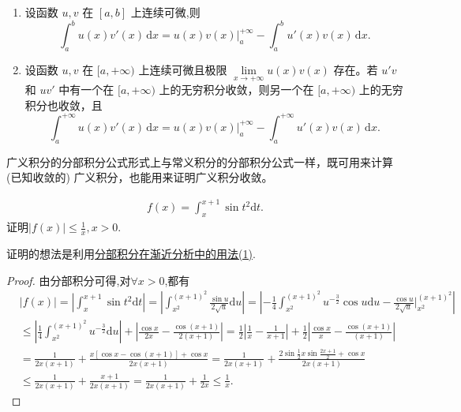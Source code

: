 \documentclass[../../main.tex]{subfiles}
\begin{document}
\begin{theorem}[分部积分公式]\label{theorem:分部积分公式}
\begin{enumerate}
\item 设函数 \( u, v \) 在 \([a, b]\) 上连续可微,则
\[
\int_a^b{u\left( x \right) v' \left( x \right) \,\mathrm{d}x}=u\left( x \right) v\left( x \right) \Big|_{a}^{+\infty}-\int_a^b{u'\left( x \right) v\left( x \right) \,\mathrm{d}x}.
\]

\item 设函数 \( u, v \) 在 \([a, +\infty)\) 上连续可微且极限 \( \lim\limits_{x \to +\infty} u(x)v(x) \) 存在。若 \( u'v \) 和 \( uv' \) 中有一个在 \([a, +\infty)\) 上的无穷积分收敛，则另一个在 \([a, +\infty)\) 上的无穷积分也收敛，且
\[
\int_a^{+\infty} u(x)v'(x) \, \mathrm{d}x = u(x)v(x) \Big |_a^{+\infty} - \int_a^{+\infty} u'(x)v(x) \, \mathrm{d}x.
\]
\end{enumerate}
\end{theorem}
\begin{remark}
广义积分的分部积分公式形式上与常义积分的分部积分公式一样，既可用来计算 (已知收敛的) 广义积分，也能用来证明广义积分收敛。
\end{remark}

\begin{example}
\begin{align*}
f\left( x \right) =\int_x^{x+1}{\sin t^2 \mathrm{d}t}.
\end{align*}
证明$\left| f\left( x \right) \right|\leqslant \frac{1}{x},x>0$.
\end{example}
\begin{note}
证明的想法是利用\hyperref[分部积分在渐近分析中的用法(1)]{分部积分在渐近分析中的用法(1)}.
\end{note}
\begin{proof}
由分部积分可得,对$\forall x>0$,都有
\begin{align*}
&\left| f\left( x \right) \right|=\left| \int_x^{x+1}{\sin t^2  \mathrm{d}t} \right|=\left| \int_{x^2}^{\left( x+1 \right) ^2}{\frac{\sin u}{2\sqrt{u}}\mathrm{d}u} \right|=\left| -\frac{1}{4}\int_{x^2}^{\left( x+1 \right) ^2}{u^{-\frac{3}{2}}\cos u\mathrm{d}u}-\frac{\cos u}{2\sqrt{u}}\Big|_{x^2}^{\left( x+1 \right) ^2} \right|
\\
&\leqslant \left| \frac{1}{4}\int_{x^2}^{\left( x+1 \right) ^2}{u^{-\frac{3}{2}}\mathrm{d}u} \right|+\left| \frac{\cos x}{2x}-\frac{\cos \left( x+1 \right)}{2\left( x+1 \right)} \right|=\frac{1}{2}\left| \frac{1}{x}-\frac{1}{x+1} \right|+\frac{1}{2}\left| \frac{\cos x}{x}-\frac{\cos \left( x+1 \right)}{\left( x+1 \right)} \right|
\\
&=\frac{1}{2x\left( x+1 \right)}+\frac{x\left[ \cos x-\cos \left( x+1 \right) \right] +\cos x}{2x\left( x+1 \right)}=\frac{1}{2x\left( x+1 \right)}+\frac{2\sin \frac{1}{2}x\sin \frac{2x+1}{2}+\cos x}{2x\left( x+1 \right)}
\\
&\leqslant \frac{1}{2x\left( x+1 \right)}+\frac{x+1}{2x\left( x+1 \right)}=\frac{1}{2x\left( x+1 \right)}+\frac{1}{2x}\leqslant \frac{1}{x}.
\end{align*}

\end{proof}
\end{document}
